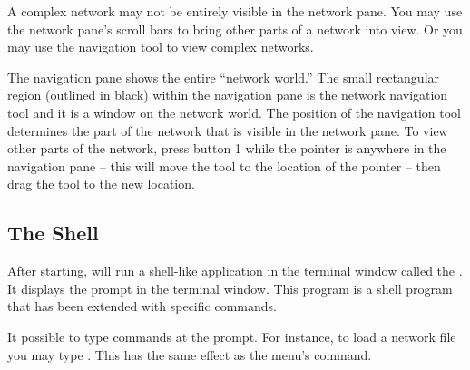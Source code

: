 A complex network may not be entirely visible in the network pane.  You may
use the network pane's scroll bars to bring other parts of a network into
view.  Or you may use the navigation tool to view complex networks.

The navigation pane shows the entire ``network world.''  The small
rectangular region (outlined in black) within the navigation pane is the
network navigation tool and it is a window on the network world.  The
position of the navigation tool determines the part of the network that is
visible in the network pane.  To view other parts of the network, press
button 1 while the pointer is anywhere in the navigation pane -- this will
move the tool to the location of the pointer --  then drag the tool to the
new location.


\subsection{The \sr{} Shell}
\label{sec:termapp}

After starting, \sr{} will run a shell-like application in the terminal
window called the .  It displays the prompt
 in the terminal window.  This program is a
 shell program that has been extended with
\sr{} specific commands.

It possible to type \tcl{} \sr{} commands at the prompt.  For
instance, to load a network file you may type .  This has the same effect as the 
menu's  command.



